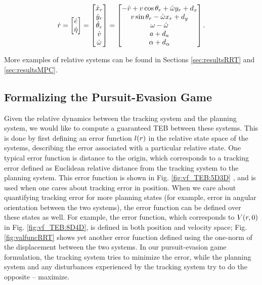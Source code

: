 \begin{equation}
\label{eq:5D_and_3D_rdyn}
\dot \rstate = 
\begin{bmatrix}
\dot \estate\\
\dot \astate
\end{bmatrix}
=
\begin{bmatrix}
\dot x_r\\
\dot y_r\\
\dot\theta_r\\
\dot v\\
\dot \omega
\end{bmatrix}
=
\begin{bmatrix}
- \hat v + v \cos \theta_r + \hat \omega y_r + \dstb_x\\
v \sin \theta_r - \hat \omega x_r + \dstb_y\\
\omega - \hat \omega \\
a + \dstb_a\\
\alpha + \dstb_\alpha
\end{bmatrix}.
\end{equation}

More examples of relative systems can be found in Sections \ref{sec:resultsRRT} and \ref{sec:resultsMPC}.

\subsection{Formalizing the Pursuit-Evasion Game}
Given the relative dynamics between the tracking system and the planning system, we would like to compute a guaranteed TEB between these systems. 
This is done by first defining an error function $l(r)$ in the relative state space of the systems, describing the error associated with a particular relative state. 
One typical error function is distance to the origin, which corresponds to a tracking error defined as Euclidean relative distance from the tracking system to the planning system. 
This error function is shown in Fig. \ref{fig:vf_TEB:5D3D} , and is used when one cares about tracking error in position.
When we care about quantifying tracking error for more planning states (for example, error in angular orientation between the two systems), the error function can be defined over these states as well.
For example, the error function, which corresponds to $V(r, 0)$  in Fig. \ref{fig:vf_TEB:8D4D}, is defined in both position and velocity space; Fig. \ref{fig:valfuncRRT} shows yet another error function defined using the one-norm of the displacement between the two systems. 
In our pursuit-evasion game formulation, the tracking system tries to minimize the error, while the planning system and any disturbances experienced by the tracking system try to do the opposite -- maximize.

